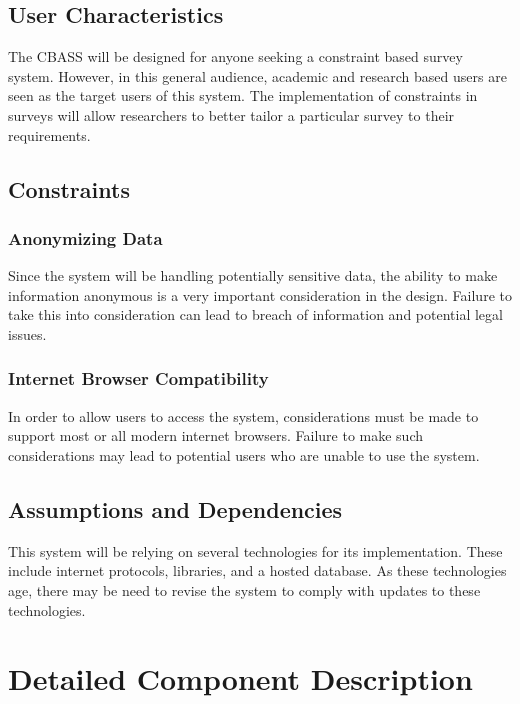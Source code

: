 \documentclass[10pt,letter]{report}
\begin{document}
\section{User Characteristics}
\label{sec:user-characteristics}

The CBASS will be designed for anyone seeking a constraint based
survey system. However, in this general audience, academic and research based
users are seen as the target users of this system. The implementation of
constraints in surveys will allow researchers to better tailor a particular
survey to their requirements.

\section{Constraints}
\label{sec:constraints}

\subsection{Anonymizing Data}
\label{sec:anonymizing-data}

Since the system will be handling potentially sensitive data, the ability to
make information anonymous is a very important consideration in the design.
Failure to take this into consideration can lead to breach of information and
potential legal issues.

\subsection{Internet Browser Compatibility}
\label{sec:internet-browser-compatibility}

In order to allow users to access the system, considerations must be made to
support most or all modern internet browsers. Failure to make such
considerations may lead to potential users who are unable to use the system.

\section{Assumptions and Dependencies}
\label{sec:assumpt-depend}

This system will be relying on several technologies for its implementation.
These include internet protocols, libraries, and a hosted database. As these
technologies age, there may be need to revise the system to comply with updates to
these technologies.

\chapter{Detailed Component Description}
\label{cha:det-comp-desc}
\end{document}

